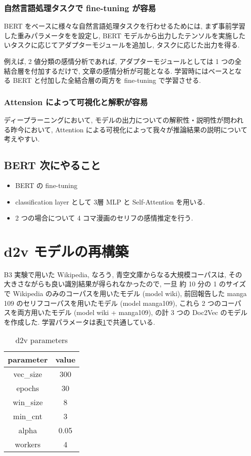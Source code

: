 \documentclass[twocolumn]{jarticle}     %
\begin{document}
\subsubsection{自然言語処理タスクで fine-tuning が容易}
BERT をベースに様々な自然言語処理タスクを行わせるためには, まず事前学習した重みパラメータをを設定し, BERT モデルから出力したテンソルを実施したいタスクに応じてアダプターモジュールを追加し, タスクに応じた出力を得る.

例えば, 2 値分類の感情分析であれば, アダプターモジュールとしては 1 つの全結合層を付加するだけで, 文章の感情分析が可能となる. 学習時にはベースとなる BERT と付加した全結合層の両方を fine-tuning で学習させる.
\subsubsection{Attension によって可視化と解釈が容易}
ディープラーニングにおいて, モデルの出力についての解釈性・説明性が問われる昨今において, Attention による可視化によって我々が推論結果の説明について考えやすい.

\subsection{BERT 次にやること}
\begin{itemize}
  \item BERT の fine-tuning
  \item classification layer として 3層 MLP と Self-Attention を用いる.
  \item 2 つの場合について 4 コマ漫画のセリフの感情推定を行う.
\end{itemize}


\section{d2v モデルの再構築}

B3 実験で用いた Wikipedia, なろう, 青空文庫からなる大規模コーパスは, その大きさながらも良い識別結果が得られなかったので,
一旦 約 10 分の 1 のサイズで Wikipedia のみのコーパスを用いたモデル (model wiki),
前回報告した manga 109 のセリフコーパスを用いたモデル (model manga109),
これら 2 つのコーパスを両方用いたモデル (model wiki + manga109),
の計 3 つの Doc2Vec のモデルを作成した. 学習パラメータは表\ref{tab:d2v}で共通している.

\begin{table}[htb]
\begin{center}
\caption{d2v parameters}
\begin{tabular}{|c|c|}
\hline
parameter & value \\ \hline
vec\_size & 300   \\
epochs    & 30    \\
win\_size & 8     \\
min\_cnt  & 3     \\
alpha     & 0.05  \\
workers   & 4     \\ \hline
\end{tabular}
\label{tab:d2v}
\end{center}
\end{table}
\end{document}
